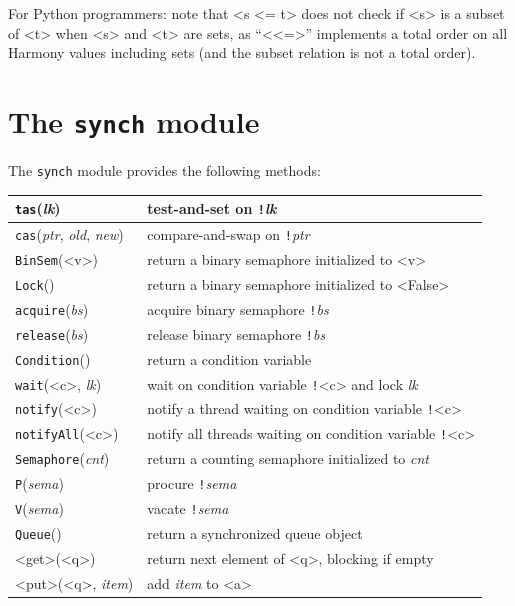 \documentclass{report}
\begin{document}
\vspace{1em}
For Python programmers: note that <{s <= t}> does not check if <{s}> is a subset of
<{t}> when <{s}> and <{t}> are sets, as ``<{<=}>'' implements a total order on all Harmony values including sets (and the subset relation is not a total order).

\section{The \texttt{synch} module}

%
The \texttt{synch} module provides the following methods:

\vspace{1em}
\begin{tabular}{|l|l|}
\hline
\texttt{tas}(\textit{lk}) & test-and-set on \texttt{!}\textit{lk} \\
\hline
\texttt{cas}(\textit{ptr}, \textit{old}, \textit{new}) & compare-and-swap on \texttt{!}\textit{ptr} \\
\hline
\texttt{BinSem}(<{v}>) & return a binary semaphore initialized to <{v}> \\
\hline
\texttt{Lock}() & return a binary semaphore initialized to <{False}> \\
\hline
\texttt{acquire}(\textit{bs}) & acquire binary semaphore \texttt{!}\textit{bs} \\
\hline
\texttt{release}(\textit{bs}) & release binary semaphore \texttt{!}\textit{bs} \\
\hline
\texttt{Condition}() & return a condition variable \\
\hline
\texttt{wait}(<{c}>, \textit{lk}) & wait on condition variable \texttt{!}<{c}>
and lock \textit{lk} \\ \hline
\texttt{notify}(<{c}>) & notify a thread waiting on condition variable \texttt{!}<{c}> \\
\hline
\texttt{notifyAll}(<{c}>) & notify all threads waiting on condition variable \texttt{!}<{c}> \\
\hline
\texttt{Semaphore}(\textit{cnt}) & return a counting semaphore initialized to \textit{cnt} \\
\hline
\texttt{P}(\textit{sema}) & procure \texttt{!}\textit{sema}  \\
\hline
\texttt{V}(\textit{sema}) & vacate \texttt{!}\textit{sema}  \\
\hline
\texttt{Queue}() & return a synchronized queue object \\
\hline
<{get}>(<{q}>) & return next element of <{q}>, blocking if empty \\
\hline
<{put}>(<{q}>, \textit{item}) & add \textit{item} to <{a}> \\
\hline
\end{tabular}
\end{document}
